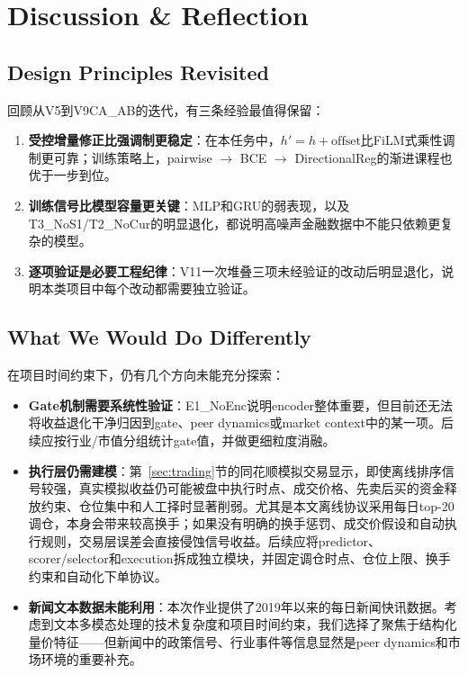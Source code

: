 \section{Discussion \& Reflection}
\label{sec:discussion}

\subsection{Design Principles Revisited}

回顾从V5到V9CA\_AB的迭代，有三条经验最值得保留：

\begin{enumerate}[leftmargin=*, itemsep=4pt]
    \item \textbf{受控增量修正比强调制更稳定}：在本任务中，$h' = h + \text{offset}$比FiLM式乘性调制更可靠；训练策略上，pairwise $\to$ BCE $\to$ DirectionalReg的渐进课程也优于一步到位。
    \item \textbf{训练信号比模型容量更关键}：MLP和GRU的弱表现，以及T3\_NoS1/T2\_NoCur的明显退化，都说明高噪声金融数据中不能只依赖更复杂的模型。
    \item \textbf{逐项验证是必要工程纪律}：V11一次堆叠三项未经验证的改动后明显退化，说明本类项目中每个改动都需要独立验证。
\end{enumerate}

\subsection{What We Would Do Differently}

在项目时间约束下，仍有几个方向未能充分探索：

\begin{itemize}[leftmargin=*, itemsep=3pt]
    \item \textbf{Gate机制需要系统性验证}：E1\_NoEnc说明encoder整体重要，但目前还无法将收益退化干净归因到gate、peer dynamics或market context中的某一项。后续应按行业/市值分组统计gate值，并做更细粒度消融。
    \item \textbf{执行层仍需建模}：第~\ref{sec:trading}节的同花顺模拟交易显示，即使离线排序信号较强，真实模拟收益仍可能被盘中执行时点、成交价格、先卖后买的资金释放约束、仓位集中和人工择时显著削弱。尤其是本文离线协议采用每日top-20调仓，本身会带来较高换手；如果没有明确的换手惩罚、成交价假设和自动执行规则，交易层误差会直接侵蚀信号收益。后续应将predictor、scorer/selector和execution拆成独立模块，并固定调仓时点、仓位上限、换手约束和自动化下单协议。
    \item \textbf{新闻文本数据未能利用}：本次作业提供了2019年以来的每日新闻快讯数据。考虑到文本多模态处理的技术复杂度和项目时间约束，我们选择了聚焦于结构化量价特征——但新闻中的政策信号、行业事件等信息显然是peer dynamics和市场环境的重要补充。
\end{itemize}

